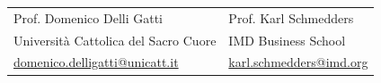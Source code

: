\documentclass[a4paper,11pt]{article}
\begin{document}
\vspace{8pt}

\begin{tabularx}{\linewidth}{X X}
Prof. Domenico Delli Gatti & Prof. Karl Schmedders \\
Università Cattolica del Sacro Cuore & IMD Business School \\
\href{mailto:domenico.delligatti@unicatt.it}{domenico.delligatti@unicatt.it} &
\href{mailto:karl.schmedders@imd.org}{karl.schmedders@imd.org}
\end{tabularx}
\end{document}
